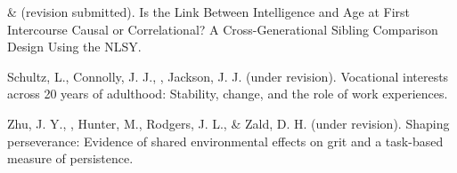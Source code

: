 \item\meb \& \Joe (revision submitted). Is the Link Between Intelligence and Age at First Intercourse Causal or Correlational? A Cross-Generational Sibling Comparison Design Using the NLSY. %
\item Schultz, L., Connolly, J. J., \meb, Jackson, J. J. (under revision). Vocational interests across 20 years of adulthood: Stability, change, and the role of work experiences.
\item Zhu, J. Y., \meb, Hunter, M., Rodgers, J. L., \& Zald, D. H. (under revision). Shaping perseverance: Evidence of shared environmental effects on grit and a task-based measure of persistence.
\vspace{-2mm}\begin{center}\end{center} \vspace{-4mm}